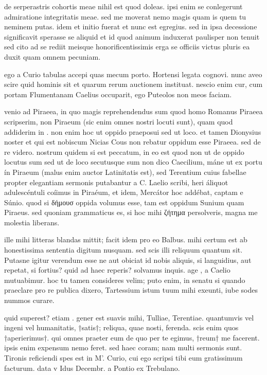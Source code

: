  de serperastris cohortis meae nihil est quod doleas. ipsi enim se conlegerunt admiratione integritatis meae. sed me moverat nemo magis quam is quem tu neminem putas. idem et initio fuerat et nunc est egregius. sed in ipsa decessione significavit sperasse se aliquid et id quod animum induxerat paulisper non tenuit sed cito ad se rediit meisque honorificentissimis erga se officiis victus pluris ea duxit quam omnem pecuniam.

 ego a Curio tabulas accepi quas mecum porto. Hortensi legata cognovi. nunc aveo scire quid hominis sit et quarum rerum auctionem instituat. nescio enim cur, cum portam Flumentanam Caelius occuparit, ego Puteolos non meos faciam.

 venio ad Piraeea, in quo magis reprehendendus sum quod homo Romanus Piraeea scripserim, non Piraeum (sic enim omnes nostri locuti sunt), quam quod addiderim in . non enim hoc ut oppido praeposui sed ut loco. et tamen Dionysius noster et qui est nobiscum Nicias Cous non rebatur oppidum esse Piraeea. sed de re videro. nostrum quidem si est peccatum, in eo est quod non ut de oppido locutus sum sed ut de loco secutusque sum non dico Caecilium, máne ut ex portu ín Piraeum (malus enim auctor Latinitatis est), sed Terentium cuius fabellae propter elegantiam sermonis putabantur a C. Laelio scribi, heri áliquot adulescéntuli coíimus in Piraéum, et idem, Mercátor hoc addébat, captam e Súnio. quod si δήμουσ oppida volumus esse, tam est oppidum Sunium quam Piraeus. sed quoniam grammaticus es, si hoc mihi ζήτημα persolveris, magna me molestia liberans.

 ille mihi litteras blandas mittit; facit idem pro eo Balbus. mihi certum est ab honestissima sententia digitum nusquam. sed scis illi reliquum quantum sit. Putasne igitur verendum esse ne aut obiciat id nobis aliquis, si languidius, aut repetat, si fortius? quid ad haec reperis? solvamus inquis. age , a Caelio mutuabimur. hoc tu tamen consideres velim; puto enim, in senatu si quando praeclare pro re publica dixero, Tartessium istum tuum mihi exeunti, iube sodes nummos curare.

 quid superest? etiam . gener est suavis mihi, Tulliae, Terentiae. quantumvis vel ingeni vel humanitatis, †satis†; reliqua, quae nosti, ferenda. scis enim quos †aperierimus†. qui omnes praeter eum de quo per te egimus, †reum† me facerent. ipsis enim expensum nemo feret. sed haec coram; nam multi sermonis sunt. Tironis reficiendi spes est in M'. Curio, cui ego scripsi tibi eum gratissimum facturum. data v Idus Decembr. a Pontio ex Trebulano.
